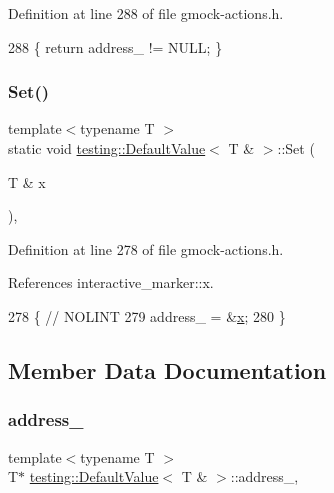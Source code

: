 Definition at line 288 of file gmock-\/actions.\+h.


\begin{DoxyCode}
288 \{ \textcolor{keywordflow}{return} address\_ != NULL; \}
\end{DoxyCode}
\mbox{\label{classtesting_1_1DefaultValue_3_01T_01_6_01_4_a9863abf3d311ce5007d7e57dfce2f252}} 
\subsubsection{\texorpdfstring{Set()}{Set()}}
{\footnotesize\ttfamily template$<$typename T $>$ \\
static void \hyperlink{classtesting_1_1DefaultValue}{testing\+::\+Default\+Value}$<$ T \& $>$\+::Set (\begin{DoxyParamCaption}\item[{T \&}]{x }\end{DoxyParamCaption})\hspace{0.3cm}{\ttfamily [inline]}, {\ttfamily [static]}}



Definition at line 278 of file gmock-\/actions.\+h.



References interactive\+\_\+marker\+::x.


\begin{DoxyCode}
278                         \{  \textcolor{comment}{// NOLINT}
279     address\_ = &\hyperlink{namespaceinteractive__marker_acda52804aef30b460a72fb21ee01d69d}{x};
280   \}
\end{DoxyCode}


\subsection{Member Data Documentation}
\mbox{\label{classtesting_1_1DefaultValue_3_01T_01_6_01_4_a320c8ae0a0e290d9058dfaca1d65f02f}} 
\subsubsection{\texorpdfstring{address\+\_\+}{address\_}}
{\footnotesize\ttfamily template$<$typename T $>$ \\
T$\ast$ \hyperlink{classtesting_1_1DefaultValue}{testing\+::\+Default\+Value}$<$ T \& $>$\+::address\+\_\+\hspace{0.3cm}{\ttfamily [static]}, {\ttfamily [private]}}



